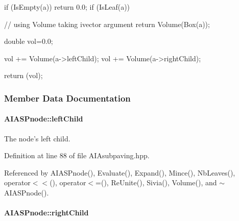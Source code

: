 \begin{DoxyCode}
{

  if (IsEmpty(a)) return 0.0;
  if (IsLeaf(a))
  {

                    // using Volume taking ivector argument
    return Volume(Box(a));
  }
  double vol=0.0;

  vol += Volume(a->leftChild);
  vol += Volume(a->rightChild);

  return (vol);
}
\end{DoxyCode}


\subsubsection{\-Member \-Data \-Documentation}
\hypertarget{classAIASPnode_a64dc679fe03b03b7beb6ddb04b2a0f85}{
\paragraph[{left\-Child}]{ {\bf \-A\-I\-A\-S\-Pnode\-::left\-Child}}}\label{classAIASPnode_a64dc679fe03b03b7beb6ddb04b2a0f85}


\-The node's left child. 



\-Definition at line 88 of file \-A\-I\-Asubpaving.\-hpp.



\-Referenced by \-A\-I\-A\-S\-Pnode(), \-Evaluate(), \-Expand(), \-Mince(), \-Nb\-Leaves(), operator$<$$<$(), operator$<$=(), \-Re\-Unite(), \-Sivia(), \-Volume(), and $\sim$\-A\-I\-A\-S\-Pnode().

\hypertarget{classAIASPnode_adbaa03014929ff2ab653d6d916ca2fc1}{
\paragraph[{right\-Child}]{ {\bf \-A\-I\-A\-S\-Pnode\-::right\-Child}}}\label{classAIASPnode_adbaa03014929ff2ab653d6d916ca2fc1}


